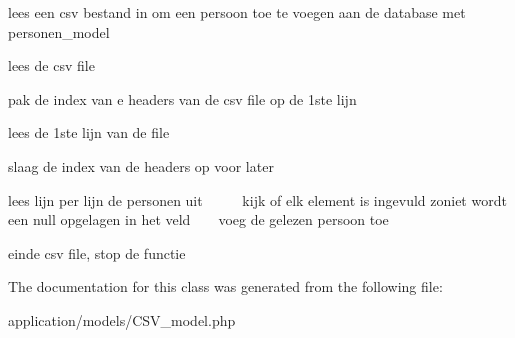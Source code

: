 lees een csv bestand in om een persoon toe te voegen aan de database met personen\+\_\+model 

lees de csv file

pak de index van e headers van de csv file op de 1ste lijn

lees de 1ste lijn van de file

slaag de index van de headers op voor later

lees lijn per lijn de personen uit ~\newline
~\newline
~\newline
 kijk of elk element is ingevuld zoniet wordt een null opgelagen in het veld ~\newline
~\newline
 voeg de gelezen persoon toe

einde csv file, stop de functie 

The documentation for this class was generated from the following file\+:\begin{DoxyCompactItemize}
\item 
application/models/C\+S\+V\+\_\+model.\+php\end{DoxyCompactItemize}
